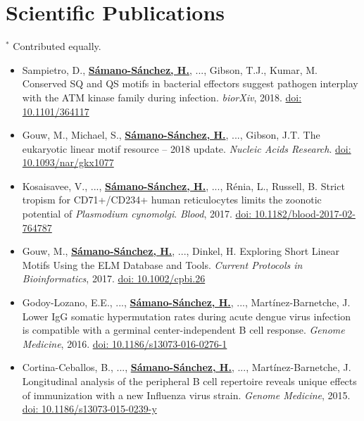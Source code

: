 \documentclass[11pt,a4paper,sans]{moderncv} %
\begin{document}
\section{Scientific Publications}
\vspace{-.1cm}
\footnotesize{$^{\ast}$ Contributed equally.} \hspace{.5cm}
\vspace{.1cm}
\begin{itemize}

\item Sampietro, D., \textbf{\underline{Sámano-Sánchez, H.}}, ..., Gibson, T.J., Kumar, M. Conserved SQ and QS motifs in bacterial effectors suggest pathogen interplay with the ATM kinase family during infection. \textit{biorXiv}, 2018. \href{https://doi.org/10.1101/364117}{doi: 10.1101/364117}
\item Gouw, M., Michael, S., \textbf{\underline{Sámano-Sánchez, H.}}, ..., Gibson, J.T. The eukaryotic linear motif resource – 2018 update. \textit{Nucleic Acids Research}. \href{https://doi.org/10.1093/nar/gkx1077}{doi: 10.1093/nar/gkx1077}
\item Kosaisavee, V., ..., \textbf{\underline{Sámano-Sánchez, H.}}, ..., Rénia, L., Russell, B. Strict tropism for CD71+/CD234+ human reticulocytes limits the zoonotic potential of \textit{Plasmodium cynomolgi}. \textit{Blood}, 2017. \href{https://doi.org/10.1182/blood-2017-02-764787}{doi: 10.1182/blood-2017-02-764787}
\item Gouw, M., \textbf{\underline{Sámano-Sánchez, H.}}, ..., Dinkel, H. Exploring Short Linear Motifs Using the ELM Database and Tools. \textit{Current Protocols in Bioinformatics}, 2017. \href{https://doi.org/10.1002/cpbi.26}{doi: 10.1002/cpbi.26}
\item Godoy-Lozano, E.E., ..., \textbf{\underline{Sámano-Sánchez, H.}}, ..., Martínez-Barnetche, J. Lower IgG somatic hypermutation rates during acute dengue virus infection is compatible with a germinal center-independent B cell response. \textit{Genome Medicine}, 2016. \href{https://doi.org/10.1186/s13073-016-0276-1}{doi: 10.1186/s13073-016-0276-1}
\item Cortina-Ceballos, B., ..., \textbf{\underline{Sámano-Sánchez, H.}}, ..., Martínez-Barnetche, J. Longitudinal analysis of the peripheral B cell repertoire reveals unique effects of immunization with a new Influenza virus strain. \textit{Genome Medicine}, 2015. \href{https://doi.org/10.1186/s13073-015-0239-y}{doi: 10.1186/s13073-015-0239-y}

\end{itemize}
\end{document}
